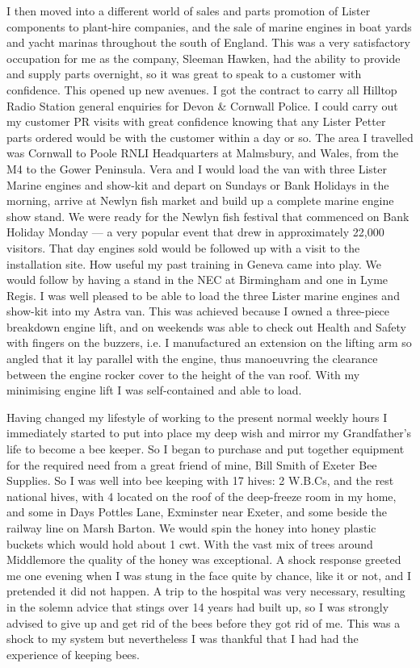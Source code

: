 I then moved into a different world of sales and parts promotion of Lister
components to plant-hire companies, and the sale of marine engines in boat
yards and yacht marinas throughout the south of England. This was a very
satisfactory occupation for me as the company, Sleeman Hawken, had the ability
to provide and supply parts overnight, so it was great to speak to a customer
with confidence. This opened up new avenues. I got the contract to carry all
Hilltop Radio Station general enquiries for Devon \& Cornwall Police. I could
carry out my customer PR visits with great confidence knowing that any Lister
Petter parts ordered would be with the customer within a day or so. The area I
travelled was Cornwall to Poole RNLI Headquarters at Malmsbury, and Wales, from
the M4 to the Gower Peninsula. Vera and I would load the van with three Lister
Marine engines and show-kit and depart on Sundays or Bank Holidays in the
morning, arrive at Newlyn fish market and build up a complete marine engine
show stand. We were ready for the Newlyn fish festival that commenced on Bank
Holiday Monday --- a very popular event that drew in approximately 22,000
visitors. That day engines sold would be followed up with a visit to the
installation site. How useful my past training in Geneva came into play. We
would follow by having a stand in the NEC at Birmingham and one in Lyme Regis.
I was well pleased to be able to load the three Lister marine engines and
show-kit into my Astra van. This was achieved because I owned a three-piece
breakdown engine lift, and on weekends was able to check out Health and Safety
with fingers on the buzzers, i.e. I manufactured an extension on the lifting
arm so angled that it lay parallel with the engine, thus manoeuvring the
clearance between the engine rocker cover to the height of the van roof. With
my minimising engine lift I was self-contained and able to load.

Having changed my lifestyle of working to the present normal weekly hours I
immediately started to put into place my deep wish and mirror my Grandfather's
life to become a bee keeper. So I began to purchase and put together equipment
for the required need from a great friend of mine, Bill Smith of Exeter Bee
Supplies. So I was well into bee keeping with 17 hives: 2 W.B.Cs, and the rest
national hives, with 4 located on the roof of the deep-freeze room in my home,
and some in Days Pottles Lane, Exminster near Exeter, and some beside the
railway line on Marsh Barton. We would spin the honey into honey plastic
buckets which would hold about 1 cwt. With the vast mix of trees around
Middlemore the quality of the honey was exceptional. A shock response greeted
me one evening when I was stung in the face quite by chance, like it or not,
and I pretended it did not happen. A trip to the hospital was very necessary,
resulting in the solemn advice that stings over 14 years had built up, so I was
strongly advised to give up and get rid of the bees before they got rid of me.
This was a shock to my system but nevertheless I was thankful that I had had
the experience of keeping bees.

